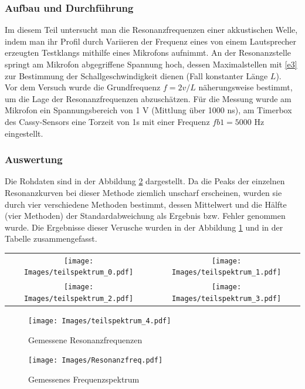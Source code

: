 \documentclass[]{article}
\begin{document}
	\subsubsection{Aufbau und Durchführung}
	Im diesem Teil untersucht man die Resonanzfrequenzen einer akkustischen Welle, indem man ihr Profil durch Variieren der Frequenz eines von einem Lautsprecher erzeugten Testklangs mithilfe eines Mikrofons aufnimmt. An der Resonanzstelle springt am Mikrofon abgegriffene Spannung hoch, dessen Maximalstellen mit \ref{e3} zur Bestimmung der Schallgeschwindigkeit dienen (Fall konstanter Länge $L$).\\
	Vor dem Versuch wurde die Grundfrequenz $f=2v/L$ näherungsweise bestimmt, um die Lage der Resonanzfrequenzen abzuschätzen. Für die Messung wurde  am Mikrofon ein Spannungsbereich von 1 V (Mittlung über 1000 ns), am Timerbox des Cassy-Sensors eine Torzeit von 1s mit einer Frequenz $fb1=5000$ Hz eingestellt.
	
	\subsubsection{Auswertung}
	
	Die Rohdaten sind in der Abbildung \ref{Resfreq} dargestellt. Da die Peaks der einzelnen Resonanzkurven bei dieser Methode ziemlich unscharf erscheinen, wurden sie durch vier verschiedene Methoden bestimmt, dessen Mittelwert und die Hälfte (vier Methoden) der Standardabweichung als Ergebnis bzw. Fehler genommen wurde. Die Ergebnisse dieser Verusche wurden in der Abbildung \ref{Resfreq_teil} und in der Tabelle zusammengefasst.\\
	\begin{center}
	\begin{tabular}{cc}
		\texttt{[image: Images/teilspektrum\_0.pdf]}& \texttt{[image: Images/teilspektrum\_1.pdf]}\\
		\texttt{[image: Images/teilspektrum\_2.pdf]}& \texttt{[image: Images/teilspektrum\_3.pdf]}\\		 
	\end{tabular} 
	\begin{figure}[h]
		\begin{center}
			\texttt{[image: Images/teilspektrum\_4.pdf]}
			\caption{Gemessene Resonanzfrequenzen}
			\label{Resfreq_teil}
		\end{center}
	\end{figure}
	\end{center}
 
	\begin{figure}
		\begin{center}
			\texttt{[image: Images/Resonanzfreq.pdf]}
			\caption{Gemessenes Frequenzspektrum}
			\label{Resfreq}
		\end{center}
	\end{figure}
\end{document}
